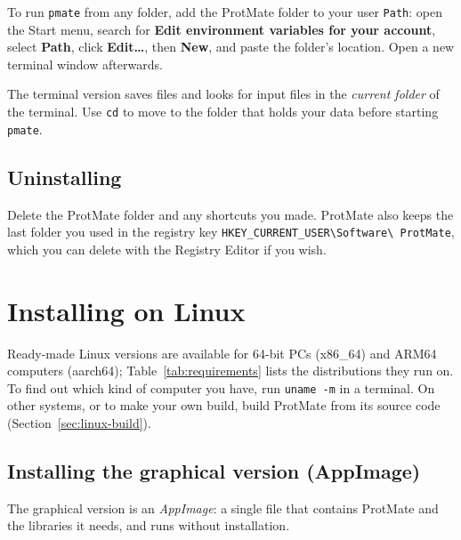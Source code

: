 \documentclass[11pt,a4paper,oneside]{report}
\newcommand{\cmd}[1]{\texttt{#1}}            %
\newcommand{\gui}[1]{\textsf{\textbf{#1}}}  %
\begin{document}
To run \cmd{pmate} from any folder, add the ProtMate folder to your user \cmd{Path}: open the
Start menu, search for \gui{Edit environment variables for your account}, select \gui{Path},
click \gui{Edit\ldots}, then \gui{New}, and paste the folder's location. Open a new terminal
window afterwards.

\begin{note}
The terminal version saves files and looks for input files in the \emph{current folder} of the
terminal. Use \cmd{cd} to move to the folder that holds your data before starting \cmd{pmate}.
\end{note}

\section{Uninstalling}

Delete the ProtMate folder and any shortcuts you made. ProtMate also keeps the last folder you
used in the registry key \cmd{HKEY\_CURRENT\_USER\textbackslash Software\textbackslash
ProtMate}, which you can delete with the Registry Editor if you wish.

\chapter{Installing on Linux}\label{ch:linux}

Ready-made Linux versions are available for 64-bit PCs (x86\_64) and ARM64 computers (aarch64);
Table~\ref{tab:requirements} lists the distributions they run on. To find out which kind of
computer you have, run \cmd{uname -m} in a terminal. On other systems, or to make your own build,
build ProtMate from its source code (Section~\ref{sec:linux-build}).

\section{Installing the graphical version (AppImage)}

The graphical version is an \emph{AppImage}: a single file that contains ProtMate and the
libraries it needs, and runs without installation.
\end{document}
